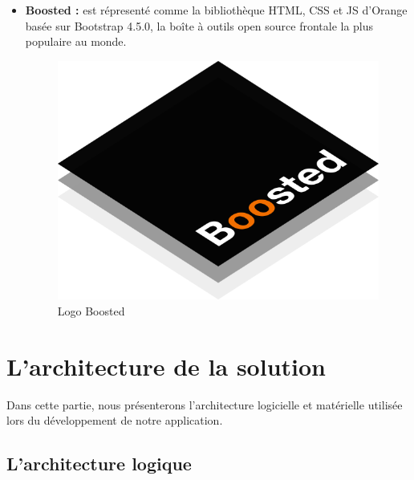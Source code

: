 \begin{itemize}
	
	\item \textbf{Boosted\cite{boosted} :} est répresenté comme la bibliothèque HTML, CSS et JS d'Orange basée sur Bootstrap 4.5.0, la boîte à outils open source frontale la plus populaire au monde.
	\begin{figure}[H]
		\centering
		\includegraphics[width=0.2\linewidth]{img/logos/boosted}
		\caption[Logo Boosted]{Logo Boosted}
		\label{fig:boosted}
	\end{figure}
\end{itemize}

\section[L'architecture de la solution]{L'architecture de la solution}
Dans cette partie, nous présenterons l'architecture logicielle et matérielle utilisée lors du développement de notre application.
\subsection[L'architecture logique]{L'architecture logique}
